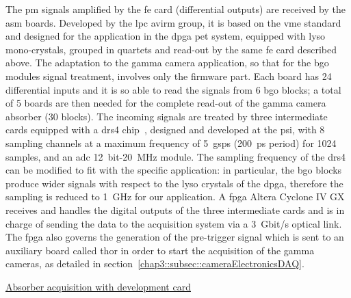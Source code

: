 The \gls{pm} signals amplified by the \gls{fe} card (differential outputs) are received by the \gls{asm} boards. Developed by the \gls{lpc} \gls{avirm} group, it is based on the \gls{vme} standard and designed for the application in the \gls{dpga} \gls{pet} system, equipped with \gls{lyso} mono-crystals, grouped in quartets and read-out by the same \gls{fe} card described above. The adaptation to the gamma camera application, so that for the \gls{bgo} modules signal treatment, involves only the firmware part. Each board has 24 differential inputs and it is so able to read the signals from 6 \gls{bgo} blocks; a total of 5 boards are then needed for the complete read-out of the gamma camera absorber (30 blocks). The incoming signals are treated by three intermediate cards  equipped with a \gls{drs}4 chip~\parencite{Ritt2009}, designed and developed at the \gls{psi}, with 8 sampling channels at a maximum frequency of 5~\gls{gsps} (200~ps period) for 1024 samples, and an \gls{adc} 12~bit-20~MHz module. The sampling frequency of the \gls{drs}4 can be modified to fit with the specific application: in particular, the \gls{bgo} blocks produce wider signals with respect to the \gls{lyso} crystals of the \gls{dpga}, therefore the sampling is reduced to 1~GHz for our application. A \gls{fpga} Altera Cyclone IV GX~\parencite{Altera2016} receives and handles the digital outputs of the three intermediate cards and is in charge of sending the data to the acquisition system via a 3~Gbit/s optical link. The \gls{fpga} also governs the generation of the pre-trigger signal which is sent to an auxiliary board called \gls{thor} in order to start the acquisition of the gamma cameras, as detailed in section~\ref{chap3::subsec::cameraElectronicsDAQ}.

\underline{Absorber acquisition with development card} 

